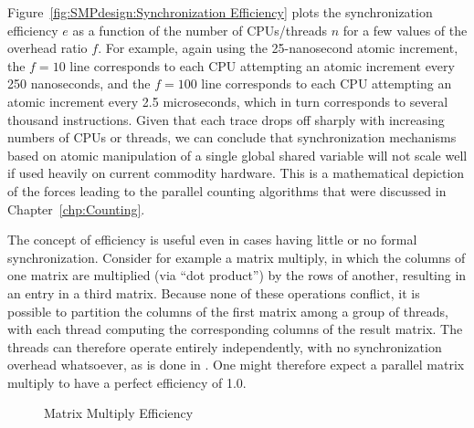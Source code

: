 Figure~\ref{fig:SMPdesign:Synchronization Efficiency} plots the synchronization
efficiency $e$ as a function of the number of CPUs/threads $n$ for
a few values of the overhead ratio $f$.
For example, again using the 25-nanosecond atomic increment, the
$f=10$ line corresponds to each CPU attempting an atomic increment
every 250 nanoseconds, and the $f=100$ line corresponds to each
CPU attempting an atomic increment every 2.5 microseconds,
which in turn corresponds to several thousand instructions.
Given that each trace drops off sharply with increasing numbers of
CPUs or threads, we can conclude that
synchronization mechanisms based on
atomic manipulation of a single global shared variable will not
scale well if used heavily on current commodity hardware.
This is a mathematical depiction of the forces leading to the parallel
counting algorithms that were discussed in Chapter~\ref{chp:Counting}.

The concept of efficiency is useful even in cases having little or
no formal synchronization.
Consider for example a matrix multiply, in which the columns of one
matrix are multiplied (via ``dot product'') by the rows of another,
resulting in an entry in a third matrix.
Because none of these operations conflict, it is possible to partition
the columns of the first matrix among a group of threads, with each thread
computing the corresponding columns of the result matrix.
The threads can therefore operate entirely independently, with no
synchronization overhead whatsoever, as is done in
.
One might therefore expect a parallel matrix multiply to have a
perfect efficiency of 1.0.

\begin{figure}[tbp]
\centering
{}
\caption{Matrix Multiply Efficiency}
\label{fig:SMPdesign:Matrix Multiply Efficiency}
\end{figure}

